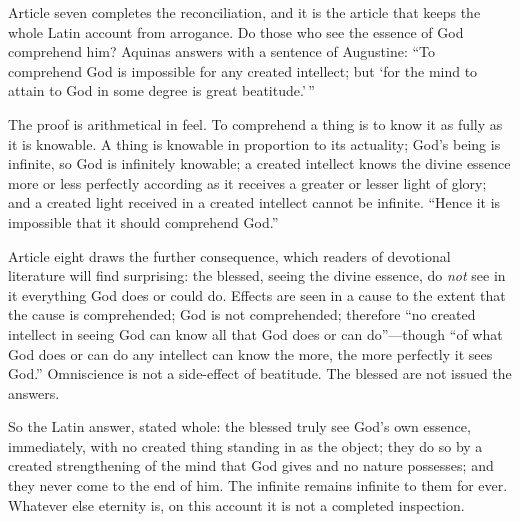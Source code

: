 Article seven completes the reconciliation, and it is the article that keeps the whole Latin account from arrogance. Do those who see the essence of God comprehend him? Aquinas answers with a sentence of Augustine: ``To comprehend God is impossible for any created intellect; but `for the mind to attain to God in some degree is great beatitude.'\,''

The proof is arithmetical in feel. To comprehend a thing is to know it as fully as it is knowable. A thing is knowable in proportion to its actuality; God's being is infinite, so God is infinitely knowable; a created intellect knows the divine essence more or less perfectly according as it receives a greater or lesser light of glory; and a created light received in a created intellect cannot be infinite. ``Hence it is impossible that it should comprehend God.''

Article eight draws the further consequence, which readers of devotional literature will find surprising: the blessed, seeing the divine essence, do \emph{not} see in it everything God does or could do. Effects are seen in a cause to the extent that the cause is comprehended; God is not comprehended; therefore ``no created intellect in seeing God can know all that God does or can do''---though ``of what God does or can do any intellect can know the more, the more perfectly it sees God.'' Omniscience is not a side-effect of beatitude. The blessed are not issued the answers.

So the Latin answer, stated whole: the blessed truly see God's own essence, immediately, with no created thing standing in as the object; they do so by a created strengthening of the mind that God gives and no nature possesses; and they never come to the end of him. The infinite remains infinite to them for ever. Whatever else eternity is, on this account it is not a completed inspection.

